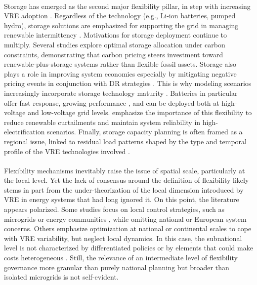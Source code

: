 \documentclass[12pt]{article}
\begin{document}
\paragraph{}
Storage has emerged as the second major flexibility pillar, in step with increasing VRE adoption \citep{yao2016}. Regardless of the technology (e.g., Li-ion batteries, pumped hydro), storage solutions are emphasized for supporting the grid in managing renewable intermittency \citep{maia2019}. Motivations for storage deployment continue to multiply. Several studies \citep{chen2020,zheng2024} explore optimal storage allocation under carbon constraints, demonstrating that carbon pricing steers investment toward renewable-plus-storage systems rather than flexible fossil assets. Storage also plays a role in improving system economics especially by mitigating negative pricing events \citep{entsoe2025} in conjunction with DR strategies \citep{li2025}. This is why modeling scenarios increasingly incorporate storage technology maturity \citep{jafari2022}. Batteries in particular offer fast response, growing performance \citep{smdani2023}, and can be deployed both at high-voltage and low-voltage grid levels. \citet{denholm2019} emphasize the importance of this flexibility to reduce renewable curtailments and maintain system reliability in high-electrification scenarios. Finally, storage capacity planning is often framed as a regional issue, linked to residual load patterns shaped by the type and temporal profile of the VRE technologies involved \citep{cebulla2017,jafari2022,oskouei2022}.


\paragraph{}
Flexibility mechanisms inevitably raise the issue of spatial scale, particularly at the local level. Yet the lack of consensus around the definition of flexibility likely stems in part from the under-theorization of the local dimension introduced by VRE in energy systems that had long ignored it. On this point, the literature appears polarized. Some studies focus on local control strategies, such as microgrids \citep{ajaz2021,almihat2025} or energy communities \citep{ponnaganti2023,debizet2023}, while omitting national or European system concerns. Others emphasize optimization at national or continental scales to cope with VRE variability, but neglect local dynamics. In this case, the subnational level is not characterized by differentiated policies or by elements that could make costs heterogeneous \citep[p.~5]{Hofbauer2022MultiLevelGovernance}. Still, the relevance of an intermediate level of flexibility
governance more granular than purely national planning but broader than isolated
microgrids is not self-evident.
\end{document}
